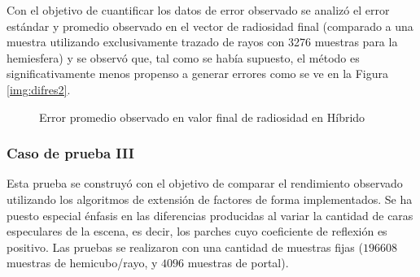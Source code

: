 Con el objetivo de cuantificar los datos de error observado se analizó el error estándar y promedio observado en el vector de radiosidad final (comparado a una muestra utilizando exclusivamente trazado de rayos con 3276 muestras para la hemiesfera) y se observó que, tal como se había supuesto, el método es significativamente menos propenso a generar errores como se ve en la Figura \ref{img:difres2}.

\begin{figure}
\caption{Error promedio observado en valor final de radiosidad en Híbrido}
\label{plot:errorcII}
\end{figure}
\subsubsection{Caso de prueba III}

Esta prueba se construyó con el objetivo de comparar el rendimiento observado utilizando los algoritmos de extensión de factores de forma implementados. Se ha puesto especial énfasis en las diferencias producidas al variar la cantidad de caras especulares de la escena, es decir, los parches cuyo coeficiente de reflexión es positivo. Las pruebas se realizaron con una cantidad de muestras fijas ($196608$ muestras de hemicubo/rayo, y $4096$‬ muestras de portal).

